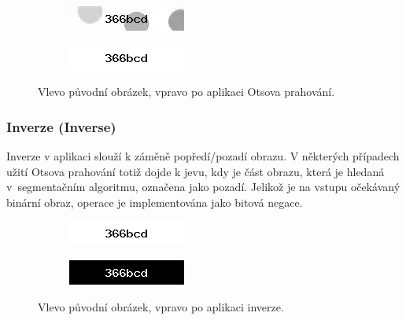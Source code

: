 \documentclass[
  field=ainfp,
  master=true,
  biblatex,
  sourcecodes=false,
  theorems=false,
  glossaries,
  index
]{kidiplom}
\begin{document}
\begin{figure}[H]
\centering
\begin{subfigure}{.5\textwidth}
  \centering
  \includegraphics[width=.8\linewidth]{images/otsu_original.png}
\end{subfigure}%
\begin{subfigure}{.5\textwidth}
  \centering
  \includegraphics[width=.8\linewidth]{images/otsu_result.png}
\end{subfigure}
\caption{Vlevo původní obrázek, vpravo po aplikaci Otsova prahování.}
\label{fig:inverse_example}
\end{figure}

\subsubsection*{Inverze (Inverse)}
Inverze v aplikaci slouží k záměně popředí/pozadí obrazu. V některých případech užití Otsova prahování totiž dojde k jevu, kdy je část obrazu, která je hledaná v~segmentačním algoritmu, označena jako pozadí. Jelikož je na vstupu očekávaný binární obraz, operace je implementována jako bitová negace.
\begin{figure}[H]
\centering
\begin{subfigure}{.5\textwidth}
  \centering
  \includegraphics[width=.8\linewidth]{images/inverse_original.png}
\end{subfigure}%
\begin{subfigure}{.5\textwidth}
  \centering
  \includegraphics[width=.8\linewidth]{images/inverse_result.png}
\end{subfigure}
\caption{Vlevo původní obrázek, vpravo po aplikaci inverze.}
\label{fig:inverse_example}
\end{figure}
\end{document}
